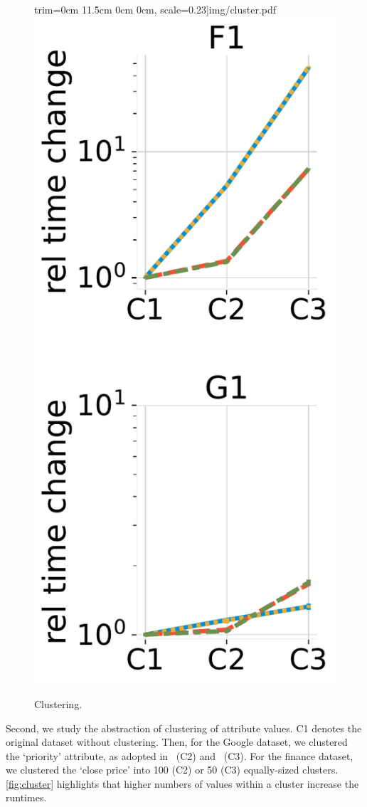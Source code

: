 \begin{figure}
	trim=0cm 11.5cm 0cm 0cm, scale=0.23]{img/cluster.pdf}
	\includegraphics[clip,
	trim=0cm .1cm 0cm 11.5cm, scale=0.23]{img/cluster.pdf}
	\vspace{-2em}
	\caption{Clustering.}
	\label{fig:cluster}
	
	\vspace{-1em}
\end{figure}
Second, we study the abstraction of clustering of attribute values. C1
denotes the original
dataset without clustering. Then, for the Google dataset, we clustered the
`priority' attribute, as adopted in~\cite{reiss2011google} (C2)
and~\cite{reiss2012towards} (C3). For the finance dataset, we clustered the
`close price' into 100 (C2) or 50 (C3)
equally-sized clusters.
\autoref{fig:cluster} highlights that higher numbers of values
within a cluster increase the runtimes.

